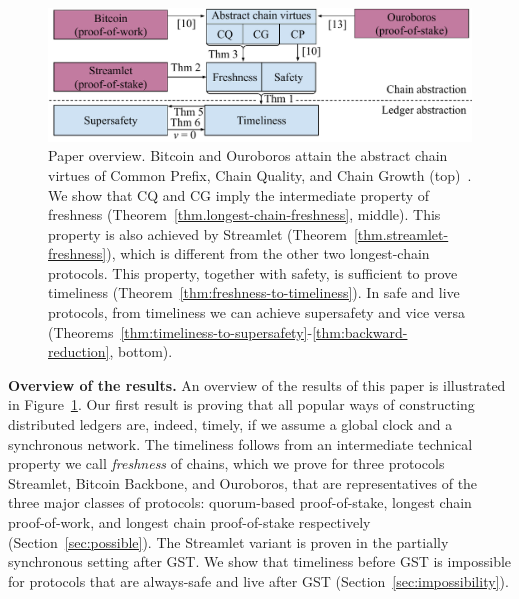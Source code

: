 \begin{figure}
  \centering
  \includegraphics[width=1.0\columnwidth,keepaspectratio]{figures/timeliness-overview.pdf}
  \caption{Paper overview. Bitcoin and Ouroboros attain the abstract chain virtues
  of Common Prefix, Chain Quality, and Chain Growth (top)~\cite{backbone,ouroboros}.
  We show that CQ and CG imply the intermediate property of freshness
  (Theorem~\ref{thm.longest-chain-freshness}, middle). This property is also achieved by Streamlet
  (Theorem~\ref{thm.streamlet-freshness}), which is different from the other two longest-chain protocols. This property, together with safety,
  is sufficient to prove timeliness
  (Theorem~\ref{thm:freshness-to-timeliness}). In safe and live protocols, from timeliness we can achieve supersafety
  and vice versa (Theorems~\ref{thm:timeliness-to-supersafety}-\ref{thm:backward-reduction}, bottom).
  }
 \label{fig:overview}
\end{figure}

\noindent
\textbf{Overview of the results.}
An overview of the results of this paper is illustrated in Figure~\ref{fig:overview}.
Our first result is proving that all popular ways of constructing distributed ledgers
are, indeed, timely, if we assume a global clock and a synchronous network.
The timeliness follows from an intermediate technical property we call \emph{freshness}
of chains, which we prove for three protocols
Streamlet, Bitcoin Backbone, and Ouroboros, that are representatives
of the three major classes of protocols: quorum-based proof-of-stake, longest chain
proof-of-work, and longest chain proof-of-stake respectively (Section~\ref{sec:possible}).
The Streamlet variant is proven in the partially synchronous setting after GST.
We show that timeliness before GST is impossible for protocols that are always-safe
and live after GST (Section~\ref{sec:impossibility}).

